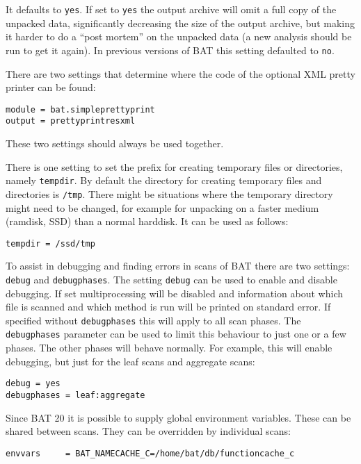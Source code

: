 \documentclass[10pt]{article}
\begin{document}
It defaults to \texttt{yes}. If set to \texttt{yes} the output archive will omit
a full copy of the unpacked data, significantly decreasing the size of the
output archive, but making it harder to do a ``post mortem'' on the unpacked
data (a new analysis should be run to get it again). In previous versions of BAT
this setting defaulted to \texttt{no}.

There are two settings that determine where the code of the optional XML pretty
printer can be found:

\begin{verbatim}
module = bat.simpleprettyprint
output = prettyprintresxml
\end{verbatim}

These two settings should always be used together.

There is one setting to set the prefix for creating temporary files or
directories, namely \texttt{tempdir}. By default the directory for creating
temporary files and directories is \texttt{/tmp}. There might be situations
where the temporary directory might need to be changed, for example for
unpacking on a faster medium (ramdisk, SSD) than a normal harddisk. It can be
used as follows:

\begin{verbatim}
tempdir = /ssd/tmp
\end{verbatim}

To assist in debugging and finding errors in scans of BAT there are two
settings: \texttt{debug} and \texttt{debugphases}. The setting \texttt{debug}
can be used to enable and disable debugging. If set multiprocessing will be
disabled and information about which file is scanned and which method is run
will be printed on standard error. If specified without \texttt{debugphases}
this will apply to all scan phases. The \texttt{debugphases} parameter can be
used to limit this behaviour to just one or a few phases. The other phases will
behave normally. For example, this will enable debugging, but just for the
leaf scans and aggregate scans:

\begin{verbatim}
debug = yes
debugphases = leaf:aggregate
\end{verbatim}

Since BAT 20 it is possible to supply global environment variables. These can
be shared between scans. They can be overridden by individual scans:

\begin{verbatim}
envvars     = BAT_NAMECACHE_C=/home/bat/db/functioncache_c
\end{verbatim}
\end{document}
